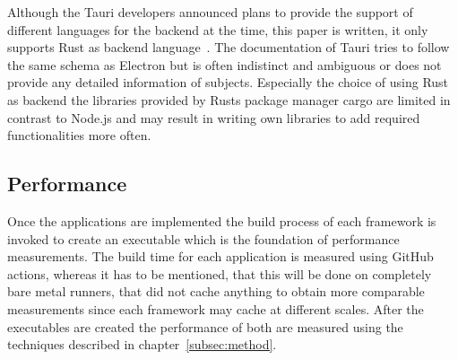 Although the Tauri developers announced plans to provide the support of different languages for the backend at the time, this paper is written, it only supports Rust as backend language~\cite{tauri}.
The documentation of Tauri tries to follow the same schema as Electron but is often indistinct and ambiguous or does not provide any detailed information of subjects.
Especially the choice of using Rust as backend the libraries provided by Rusts package manager cargo are limited in contrast to Node.js and may result in writing own libraries to add required functionalities more often.

\subsection{Performance}
\label{subsec:impl:performance}
Once the applications are implemented the build process of each framework is invoked to create an executable which is the foundation of performance measurements.
The build time for each application is measured using GitHub actions, whereas it has to be mentioned, that this will be done on completely bare metal runners, that did not cache anything to obtain more comparable measurements
since each framework may cache at different scales.
After the executables are created the performance of both are measured using the techniques described in chapter~\ref{subsec:method}.

